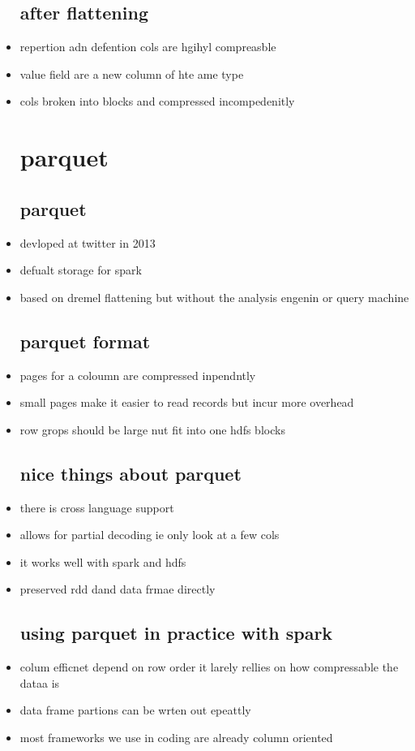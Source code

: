 \documentclass{article}
\begin{document}
\begin{itemize}
\subsection*{after flattening}
\item repertion adn defention cols are hgihyl compreasble 
\item value field are a new column of hte ame type 
\item cols broken into blocks and compressed incompedenitly 
\section*{parquet}
\subsection*{parquet}
\item devloped at twitter in 2013
\item defualt storage for spark 
\item based on dremel flattening but without the analysis engenin or query machine 
\subsection*{parquet format}
\item pages for a coloumn are compressed inpendntly 
\item small pages make it easier to read records but incur more overhead 
\item row grops should be large nut fit into one hdfs blocks
\subsection*{nice things about parquet}
\item there is cross language support 
\item allows for partial decoding ie only look at a few cols 
\item it works well with spark and hdfs 
\item preserved rdd dand data frmae directly 
\subsection*{using parquet in practice with spark}
\item colum efficnet depend on row order it larely rellies on how compressable the dataa is 
\item data frame partions can be wrten out epeattly
\item most frameworks we use in coding are already column oriented
\end{itemize}
\end{document}
